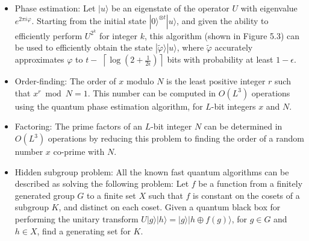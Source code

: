 \begin{itemize}
  \item Phase estimation: Let $|u\rangle$ be an eigenstate of the operator $U$ with eigenvalue $e^{2 \pi i \varphi}$. Starting from the initial state $|0\rangle^{\otimes t}|u\rangle$, and given the ability to efficiently perform $U^{2^{k}}$ for integer $k$, this algorithm (shown in Figure 5.3) can be used to efficiently obtain the state $|\tilde{\varphi}\rangle|u\rangle$, where $\tilde{\varphi}$ accurately approximates $\varphi$ to $t-$ $\left\lceil\log \left(2+\frac{1}{2 \epsilon}\right)\right\rceil$ bits with probability at least $1-\epsilon$.
  \item Order-finding: The order of $x$ modulo $N$ is the least positive integer $r$ such that $x^{r} \bmod N=1$. This number can be computed in $O\left(L^{3}\right)$ operations using the quantum phase estimation algorithm, for $L$-bit integers $x$ and $N$.
  \item Factoring: The prime factors of an $L$-bit integer $N$ can be determined in $O\left(L^{3}\right)$ operations by reducing this problem to finding the order of a random number $x$ co-prime with $N$.
  \item Hidden subgroup problem: All the known fast quantum algorithms can be described as solving the following problem: Let $f$ be a function from a finitely generated group $G$ to a finite set $X$ such that $f$ is constant on the cosets of a subgroup $K$, and distinct on each coset. Given a quantum black box for performing the unitary transform $U|g\rangle|h\rangle=|g\rangle|h \oplus f(g)\rangle$, for $g \in G$ and $h \in X$, find a generating set for $K$.
\end{itemize}

